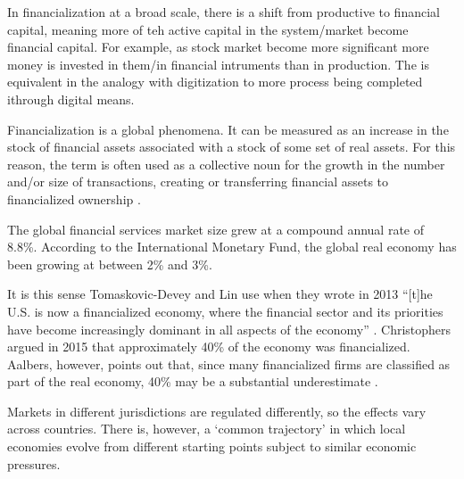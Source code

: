 In financialization at a broad scale, there is a shift from productive to financial capital, meaning more of teh active capital in the system/market become financial capital. 
For example, as stock market become more significant more money is invested in them/in financial intruments than in production. 
The is equivalent in the analogy with digitization to more process being completed ithrough digital means. 


Financialization is a global phenomena. It can be measured as an increase in the stock of financial assets associated with a stock of some set of real assets. For this reason, the term is often used as a collective noun for the growth in the number and/or size of transactions, creating or transferring financial assets to financialized ownership \cite{GET_financialization-numberOfTransactions}. %


The global financial services market size grew at a compound annual rate of 8.8\%. According to the International Monetary Fund,  the global real economy has been growing at between 2\% and 3\%.

It is this sense Tomaskovic-Devey and Lin use when they wrote in 2013 ``[t]he U.S. is now a financialized economy, where the financial sector and its priorities have become increasingly dominant in all aspects of the economy'' \cite{tomaskovic-deveyFinancializationCausesInequality2013}. Christophers argued in 2015 that approximately 40\% of the economy was financialized. Aalbers, however, points out that, since many financialized firms are classified as part of the real economy, 40\% may be a substantial underestimate \cite{aalbersPotentialFinancialization2015}.



Markets in different jurisdictions are regulated differently, so the effects vary across countries. There is, however, a ‘common trajectory’ \cite{hayCommonTrajectoriesVariable2004}\cite{aalbersConversationLandRent2018} in which local economies evolve from different starting points subject to similar economic pressures.



